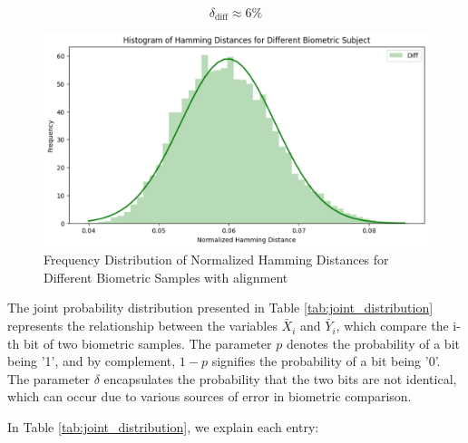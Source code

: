 \begin{enumerate}
\begin{itemize}
        \[ \delta_{\text{diff}} \approx 6\% \]

        \begin{figure}[H]
            \centering
            \includegraphics[width=0.7\linewidth]{latex-img/delta_diff.png}
            \caption{Frequency Distribution of Normalized Hamming Distances for Different Biometric Samples with alignment}
            \label{delta_diff}
        \end{figure}
    \end{itemize}
\end{enumerate}

The joint probability distribution presented in Table \ref{tab:joint_distribution} represents the relationship between the variables \(\bar{X}_i\) and \(\bar{Y}_i\), which compare the i-th bit of two biometric samples. The parameter \(p\) denotes the probability of a bit being '1', and by complement, \(1-p\) signifies the probability of a bit being '0'. The parameter \(\delta\) encapsulates the probability that the two bits are not identical, which can occur due to various sources of error in biometric comparison. 

In Table \ref{tab:joint_distribution}, we explain each entry:

